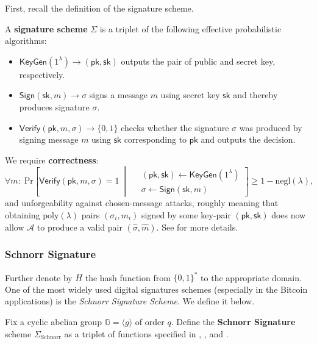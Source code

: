 \documentclass{template}
\begin{document}
First, recall the definition of the signature scheme.
\begin{definition}
    A \textbf{signature scheme} $\Sigma$ is a triplet of the following effective
    probabilistic algorithms:
    \begin{itemize}
        \item $\mathsf{KeyGen}(1^{\lambda}) \to (\mathsf{pk},\mathsf{sk})$
        outputs the pair of public and secret key, respectively.
        \item $\mathsf{Sign}(\mathsf{sk}, m) \to \sigma$ signs a message 
        $m$ using secret key $\mathsf{sk}$ and thereby produces signature $\sigma$.
        \item $\mathsf{Verify}(\mathsf{pk}, m, \sigma) \to \{0,1\}$ checks
        whether the signature $\sigma$ was produced by signing message $m$ using
        $\mathsf{sk}$ corresponding to $\mathsf{pk}$ and outputs the decision.
    \end{itemize}

    We require \textbf{correctness}:
    \begin{equation*}
        \forall m: \; \text{Pr}\left[ \mathsf{Verify}(\mathsf{pk}, m, \sigma) = 1 \;\middle|\; \begin{aligned}
            &(\mathsf{pk}, \mathsf{sk}) \gets \mathsf{KeyGen}(1^{\lambda}) \\
            &\sigma \gets \mathsf{Sign}(\mathsf{sk}, m)
        \end{aligned} \right] \geq 1 - \text{negl}(\lambda),
    \end{equation*}
    and unforgeability against chosen-message attacks, roughly meaning that
    obtaining $\text{poly}(\lambda)$ pairs $(\sigma_i,m_i)$ signed by some
    key-pair $(\mathsf{pk},\mathsf{sk})$ does now allow $\mathcal{A}$ to produce
    a valid pair $(\widehat{\sigma},\widehat{m})$. See \cite[Section
    13]{BonehShoup2023} for more details.
\end{definition}

\subsubsection{Schnorr Signature}

Further denote by $H$ the hash function from $\{0,1\}^*$ to the appropriate
domain. One of the most widely used digital signatures schemes (especially in
the Bitcoin applications) is the \textit{Schnorr Signature Scheme}. We define it
below.

\begin{definition}\label{def:schnorr}
    Fix a cyclic abelian group $\mathbb{G} = \langle g \rangle$ of order $q$.
    Define the \textbf{Schnorr Signature} scheme $\Sigma_{\text{Schnorr}}$ as a
    triplet of functions specified in ,
    , and .
\end{definition}
\end{document}
